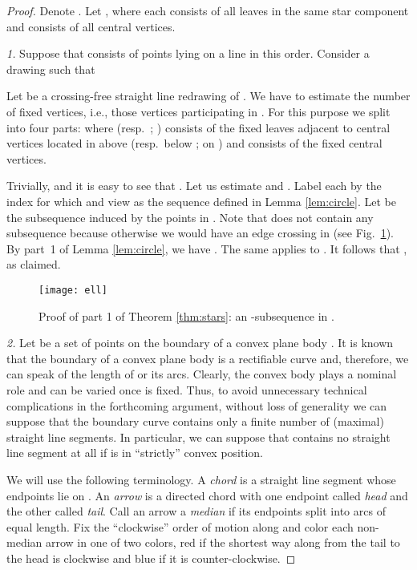 \documentclass[reqno,12pt]{amsart}
\newcounter{claim}
\begin{document}
\begin{proof}
Denote .
Let , where each  consists of all  leaves
in the same star component and  consists of all  central vertices.

{\sl 1.}
Suppose that  consists of points  lying on a line  in this order.
Consider a drawing  such that

Let  be a crossing-free straight line redrawing of .
We have to estimate the number of fixed vertices, i.e., those vertices
participating in 
.
For this purpose we split  into four parts:  where
 (resp.\ ; ) consists of the fixed leaves adjacent to central vertices
located in  above  (resp.\ below ; on )
and  consists of the fixed central vertices.

Trivially,  and it is easy to see that . Let us estimate  and .
Label each  by the index  for which  and view 
as the sequence  defined in Lemma \ref{lem:circle}. 
Let  be the subsequence induced by the points in .
Note that  does not contain any subsequence  because
otherwise we would have an edge crossing in  (see Fig.~\ref{fig:cross}).
By part~1 of Lemma \ref{lem:circle}, we have . The same applies to .
It follows that , as claimed.



\begin{figure}
\centerline{\texttt{[image: ell]}}
\caption{Proof of part 1 of Theorem \protect\ref{thm:stars}: an -subsequence in .}
\label{fig:cross}
\end{figure}


{\sl 2.}
Let  be a set of  points
on the boundary  of a convex plane body . 
It is known that the boundary of a convex plane body is a rectifiable curve and,
therefore, we can speak of the length of  or its arcs.
Clearly, the convex body  plays a nominal role and can be varied once 
is fixed.
Thus, to avoid unnecessary technical complications in the forthcoming
argument, without loss of generality we can suppose that the boundary
curve  contains only a finite number of (maximal) straight line segments.
In particular, we can suppose that  contains no straight line segment at all
if  is in ``strictly'' convex position.

We will use the following terminology. A \emph{chord} is a straight line
segment whose endpoints lie on . An \emph{arrow} is a directed chord
with one endpoint called \emph{head} and the other called \emph{tail}.
Call an arrow a \emph{median} if its endpoints split  into arcs
of equal length. Fix the ``clockwise'' order of motion along  and
color each non-median arrow in one of two colors, red if the shortest way
along  from the tail to the head is clockwise and blue if it is
counter-clockwise.


\end{proof}
\end{document}
